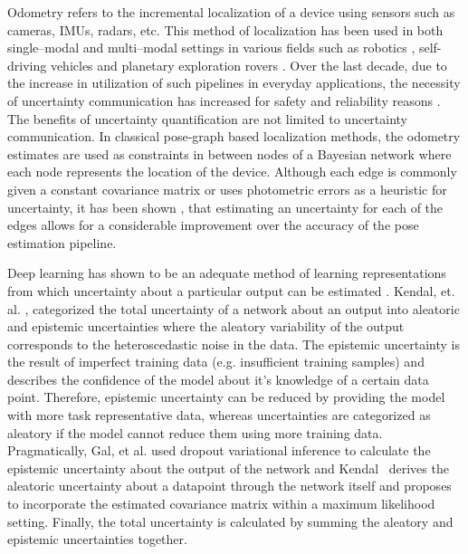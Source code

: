 \documentclass[letterpaper, 10 pt]{ieeeconf}  %
\begin{document}
Odometry refers to the incremental localization of a device using sensors such as cameras, IMUs, radars, etc. This method of localization has been used in both single--modal \cite{wang2017deepvo} and multi--modal \cite{chen2019selectivevio} settings in various fields such as robotics \cite{yousif2015overview}, self-driving vehicles \cite{howard2008real} and planetary exploration rovers \cite{cheng2005visual}. Over the last decade, due to the increase in utilization of such pipelines in everyday applications, the necessity of uncertainty communication has increased for safety and reliability reasons \cite{abdar2020review}. The benefits of uncertainty quantification are not limited to uncertainty communication. In classical pose-graph based localization methods, the odometry estimates are used as constraints in between nodes of a Bayesian network where each node represents the location of the device. Although each edge is commonly given a constant covariance matrix or uses photometric errors as a heuristic for uncertainty, it has been shown \cite{wang2018end}, that estimating an uncertainty for each of the edges allows for a considerable improvement over the accuracy of the pose estimation pipeline.

Deep learning has shown to be an adequate method of learning representations from which uncertainty about a particular output can be estimated \cite{abdar2020review}. Kendal, et. al. \cite{kendall2017uncertainties}, categorized the total uncertainty of a network about an output into aleatoric and epistemic uncertainties where the aleatory variability of the output corresponds to the heteroscedastic noise in the data. The epistemic uncertainty is the result of imperfect training data (e.g. insufficient training samples) and describes the confidence of the model about it's knowledge of a certain data point. Therefore, epistemic uncertainty can be reduced by providing the model with more task representative data, whereas uncertainties are categorized as aleatory if the model cannot reduce them using more training data. 
Pragmatically, Gal, et al. \cite{gal2016dropout} used dropout variational inference to calculate the epistemic uncertainty about the output of the network and Kendal~\cite{kendall2017uncertainties} derives the aleatoric uncertainty about a datapoint through the network itself and proposes to incorporate the estimated covariance matrix within a maximum likelihood setting. Finally, the total uncertainty is calculated by summing the aleatory and epistemic uncertainties together.
\end{document}
